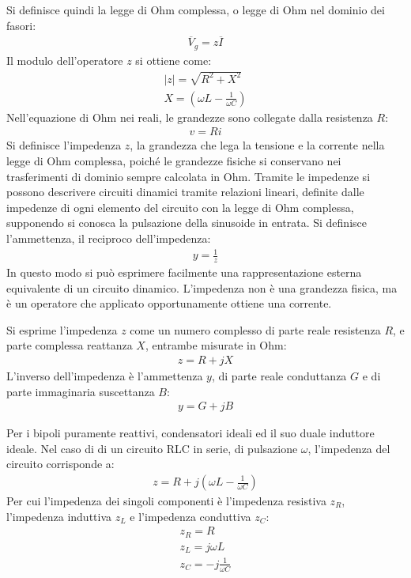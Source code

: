 \documentclass{article}
\numberwithin{equation}{subsection}
\begin{document}
Si definisce quindi la legge di Ohm complessa, o legge di Ohm nel dominio dei fasori:
\begin{gather*}
    \overline{V}_g=z\overline{I}
\end{gather*}
Il modulo dell'operatore $z$ si ottiene come:
\begin{gather*}
    |z|=\displaystyle\sqrt{R^2+X^2}\\
    X=\left(\omega L-\displaystyle\frac{1}{\omega C}\right)
\end{gather*}
Nell'equazione di Ohm nei reali, le grandezze sono collegate dalla resistenza $R$:
\begin{gather*}
    v=Ri
\end{gather*}
Si definisce l'impedenza $z$, la grandezza che lega la tensione e la corrente nella legge di Ohm complessa, poiché le grandezze fisiche si conservano nei trasferimenti di 
dominio sempre calcolata in Ohm. 
Tramite le impedenze si possono descrivere circuiti dinamici tramite relazioni lineari, definite dalle impedenze di ogni elemento del circuito con la legge di Ohm complessa, 
supponendo si conosca la pulsazione della sinusoide in entrata. 
Si definisce l'ammettenza, il reciproco dell'impedenza:
\begin{gather*}
    y=\displaystyle\frac{1}{z}
\end{gather*}
In questo modo si può esprimere facilmente una rappresentazione esterna equivalente di un circuito dinamico. 
L'impedenza non è una grandezza fisica, ma è un operatore che applicato opportunamente ottiene una corrente. 


Si esprime l'impedenza $z$ come un numero complesso di parte reale resistenza $R$, e parte complessa reattanza $X$, entrambe misurate in Ohm:
\begin{gather*}
    z=R+jX
\end{gather*}
L'inverso dell'impedenza è l'ammettenza $y$, di parte reale conduttanza $G$ e di parte immaginaria suscettanza $B$:
\begin{gather*}
    y=G+jB
\end{gather*}

Per i bipoli puramente reattivi, condensatori ideali ed il suo duale induttore ideale. 
Nel caso di di un circuito RLC in serie, di pulsazione $\omega$, l'impedenza del circuito corrisponde a:
\begin{gather*}
    z=R+j\left(\displaystyle \omega L-\frac{1}{\omega C}\right)
\end{gather*}
Per cui l'impedenza dei singoli componenti è l'impedenza resistiva $z_R$, l'impedenza induttiva $z_L$ e l'impedenza conduttiva $z_C$:
\begin{gather*}
    z_R=R\\
    z_L=j\omega L\\
    z_C=\displaystyle -j\frac{1}{\omega C}
\end{gather*}
\end{document}
